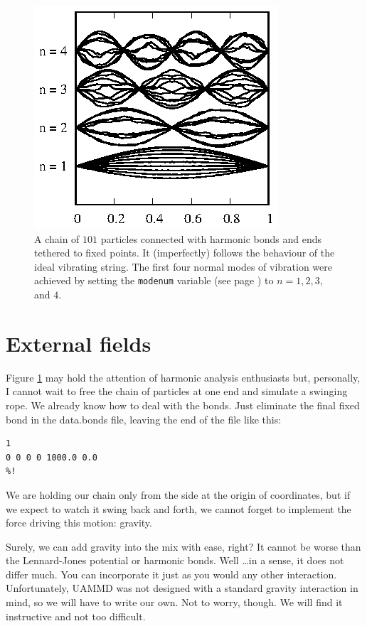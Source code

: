 \begin{figure}
  \centering
  \includegraphics[width = 0.6 \textwidth]{figures/vibratingString.eps}
  \caption{\label{vibratingString}A chain of $101$ particles connected with
           harmonic bonds and ends tethered to fixed points. It (imperfectly)
           follows the behaviour of the ideal vibrating string. The first four
           normal modes of vibration were achieved by setting the
           \texttt{modenum} variable (see page
           \pageref{stringInitialConditions}) to $n = 1, 2, 3,$ and $4$.}
\end{figure}

\section{External fields}

Figure \ref{vibratingString} may hold the attention of harmonic analysis
enthusiasts but, personally, I cannot wait to free the chain of particles at one
end and simulate a swinging rope. We already know how to deal with the bonds.
Just eliminate the final fixed bond in the data.bonds file, leaving the end of
the file like this:
\begin{lstlisting}
1
0 0 0 0 1000.0 0.0
%!
\end{lstlisting}

We are holding our chain only from the side at the origin of coordinates, but if 
we expect to watch it swing back and forth, we cannot forget to implement the 
force driving this motion: gravity.

Surely, we can add gravity into the mix with ease, right? It cannot be worse 
than the Lennard-Jones potential or harmonic bonds. Well \ldots in a sense, it 
does not differ much. You can incorporate it just as you would any other 
interaction. Unfortunately, UAMMD was not designed with a standard gravity 
interaction in mind, so we will have to write our own. Not to worry, though. We 
will find it instructive and not too difficult.

